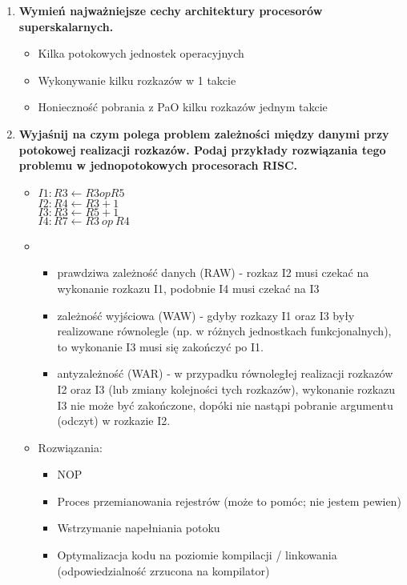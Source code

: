 \begin{enumerate}
			\item \textbf{Wymień najważniejsze cechy architektury procesorów superskalarnych.}
			\label{itm:superskalar}
			\begin{itemize}
				\item Kilka potokowych jednostek operacyjnych
				\item Wykonywanie kilku rozkazów w 1 takcie
				\item Honieczność pobrania z PaO kilku rozkazów jednym takcie
			\end{itemize}
			
			
			\item \textbf{Wyjaśnij na czym polega problem zależności między danymi przy potokowej realizacji rozkazów. Podaj przykłady rozwiązania tego problemu w jednopotokowych procesorach RISC.}
			\begin{itemize}
				\item $ I1: R3 \leftarrow R3 op R5 $\\
					$ I2: R4 \leftarrow R3 + 1 $\\
					$ I3: R3 \leftarrow R5 + 1 $\\
					$ I4: R7 \leftarrow R3\:op\:R4 $
				\item 
				\begin{itemize}
					\item prawdziwa zależność danych (RAW) - rozkaz I2 musi czekać na wykonanie rozkazu I1, podobnie I4 musi czekać na I3
					\item zależność wyjściowa (WAW) - gdyby rozkazy I1 oraz I3 były realizowane równolegle (np. w różnych jednostkach funkcjonalnych), to wykonanie I3 musi się zakończyć po I1.
					\item antyzależność (WAR) - w przypadku równoległej realizacji rozkazów I2 oraz I3 (lub zmiany kolejności tych rozkazów), wykonanie rozkazu I3 nie może być zakończone, dopóki nie nastąpi pobranie argumentu (odczyt) w rozkazie I2.
				\end{itemize}
				\newpage
				\item Rozwiązania:
				\begin{itemize}
					\item NOP
					\item Proces przemianowania rejestrów (może to pomóc; nie jestem pewien)
					\item Wstrzymanie napełniania potoku
					\item Optymalizacja kodu na poziomie kompilacji / linkowania (odpowiedzialność zrzucona na kompilator)
				\end{itemize}

\end{itemize}
\end{enumerate}
